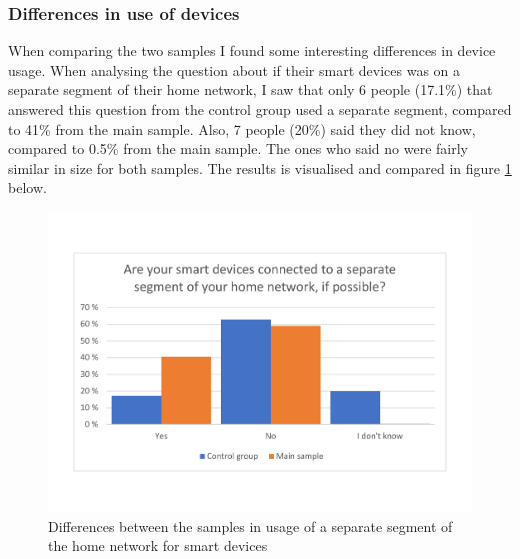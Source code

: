 \subsubsection{Differences in use of devices}
When comparing the two samples I found some interesting differences in device usage. When analysing the question about if their smart devices was on a separate segment of their home network, I saw that only 6 people (17.1\%) that answered this question from the control group used a separate segment, compared to 41\% from the main sample. Also, 7 people (20\%) said they did not know, compared to 0.5\% from the main sample. The ones who said no were fairly similar in size for both samples. The results is visualised and compared in figure \ref{fig:controlgroup_separatesegment} below.
\begin{figure}[!h]
    \centering
    \includegraphics[scale=0.40]{figures/diagrams/controlgroup_separatesegment.pdf}
    \caption{Differences between the samples in usage of a separate segment of the home network for smart devices}
    \label{fig:controlgroup_separatesegment}
\end{figure}

